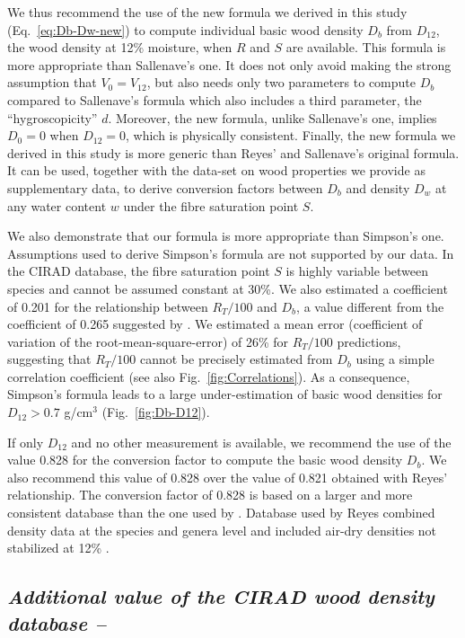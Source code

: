 \documentclass[a4paper, 12pt, leqno, dvipsnames]{article}\usepackage[]{graphicx}\usepackage[]{color}
\begin{document}
We thus recommend the use of the new formula we derived in this study (Eq.~\ref{eq:Db-Dw-new}) to compute individual basic wood density $D_{b}$ from $D_{12}$, the wood density at 12\% moisture, when $R$ and $S$ are available. This formula is more appropriate than Sallenave's one. It does not only avoid making the strong assumption that $V_0=V_{12}$, but also needs only two parameters to compute $D_b$ compared to Sallenave's formula which also includes a third parameter, the ``hygroscopicity'' $d$. Moreover, the new formula, unlike Sallenave's one, implies $D_0=0$ when $D_{12}=0$, which is physically consistent. Finally, the new formula we derived in this study is more generic than Reyes' and Sallenave's original formula. It can be used, together with the data-set on wood properties we provide as supplementary data, to derive conversion factors between $D_b$ and density $D_w$ at any water content $w$ under the fibre saturation point $S$.

We also demonstrate that our formula is more appropriate than Simpson's one. Assumptions used to derive Simpson's formula are not supported by our data. In the CIRAD database, the fibre saturation point $S$ is highly variable between species and cannot be assumed constant at 30\%. We also estimated a coefficient of 0.201 for the relationship between $R_T/100$ and $D_b$, a value different from the coefficient of 0.265 suggested by \citet{Stamm1964}. We estimated a mean error (coefficient of variation of the root-mean-square-error) of 26\% for $R_T/100$ predictions, suggesting that $R_T/100$ cannot be precisely estimated from $D_b$ using a simple correlation coefficient (see also Fig.~\ref{fig:Correlations}). As a consequence, Simpson's formula leads to a large under-estimation of basic wood densities for $D_{12}>0.7$ g/cm$^3$ (Fig.~\ref{fig:Db-D12}).

If only $D_{12}$ and no other measurement is available, we recommend the use of the value 0.828 for the conversion factor to compute the basic wood density $D_b$. We also recommend this value of 0.828 over the value of 0.821 obtained with Reyes' relationship. The conversion factor of 0.828 is based on a larger and more consistent database than the one used by \citet{Reyes1992}. Database used by Reyes combined density data at the species and genera level and included air-dry densities not stabilized at 12\% \citep{Chudnoff1984}. 

\subsection*{\textit{Additional value of the CIRAD wood density database --}}
\end{document}
